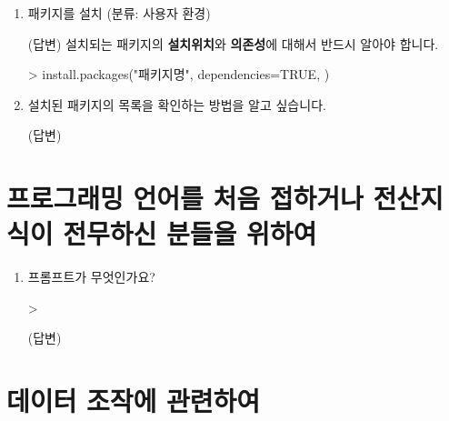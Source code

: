 \documentclass{article}
\begin{document}
\begin{enumerate}
	\item 패키지를 설치 (분류: 사용자 환경)  
	
	\textsf{(답변)} 설치되는 패키지의 \textbf{설치위치}와 \textbf{의존성}에 대해서 반드시 알아야 합니다. 
	
	\begin{Schunk}
	\begin{Soutput}
	> install.packages("패키지명", dependencies=TRUE, )
	\end{Soutput}
	\end{Schunk}

	\item 설치된 패키지의 목록을 확인하는 방법을 알고 싶습니다.
	
	\textsf{(답변)} 

\end{enumerate}


%
%
%

\section{프로그래밍 언어를 처음 접하거나 전산지식이 전무하신 분들을 위하여}

\begin{enumerate}
	\item 프롬프트가 무엇인가요? 
	\begin{Schunk}
	\begin{Soutput}
	>
	\end{Soutput}
	\end{Schunk}
	
	\textsf{(답변)} 

\end{enumerate}



%
%
%

\section{데이터 조작에 관련하여}
\end{document}
